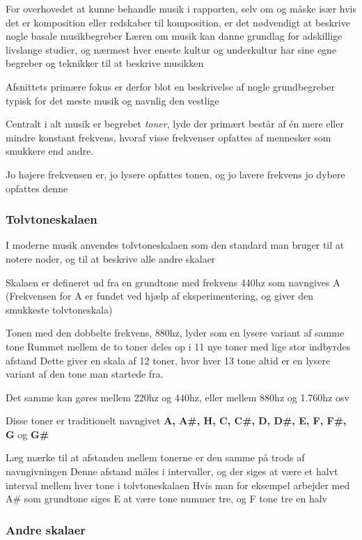 For overhovedet at kunne behandle musik i rapporten, selv om og måske især hvis det er komposition eller redskaber til komposition, er det nødvendigt at beskrive nogle basale musikbegreber
Læren om musik kan danne grundlag for adskillige livslange studier, og nærmest hver eneste kultur og underkultur har sine egne begreber og teknikker til at beskrive musikken


Afsnittets primære fokus er derfor blot en beskrivelse af nogle grundbegreber typisk for det meste musik og navnlig den vestlige


Centralt i alt musik er begrebet  \textit{toner}, lyde der primært består af én mere eller mindre konstant frekvens, hvoraf visse frekvenser opfattes af mennesker som smukkere end andre.

Jo højere frekvensen er, jo lysere opfattes tonen, og jo lavere frekvens jo dybere opfattes denne
\cite{msparkMusic}

\subsubsection{Tolvtoneskalaen}

I moderne musik anvendes tolvtoneskalaen som den standard man bruger til at notere noder, og til at beskrive alle andre skalaer


Skalaen er defineret ud fra en grundtone med frekvens 440hz som navngives A (Frekvensen for A er fundet ved hjælp af eksperimentering, og giver den smukkeste tolvtoneskala)
\cite{msparkMusic}

Tonen med den dobbelte frekvens, 880hz, lyder som en lysere variant af samme tone
Rummet mellem de to toner deles op i 11 nye toner med lige stor indbyrdes afstand
Dette giver en skala af 12 toner, hvor hver 13
tone altid er en lysere variant af den tone man startede fra.

Det samme kan gøres mellem 220hz og 440hz, eller mellem 880hz og 1.760hz osv
\cite{msparkMusic}

Disse toner er traditionelt navngivet \textbf{A, A\#, H, C, C\#, D, D\#, E, F, F\#, G} og \textbf{G\#} 

Læg mærke til at afstanden mellem tonerne er den samme på trods af navngivningen
Denne afstand måles i intervaller, og der siges at være et halvt interval mellem hver tone i tolvtoneskalaen
Hvis man for eksempel arbejder med A\# som grundtone siges E at være tone nummer tre, og F tone tre en halv
\cite{msparkMusic}

\subsubsection{Andre skalaer}

